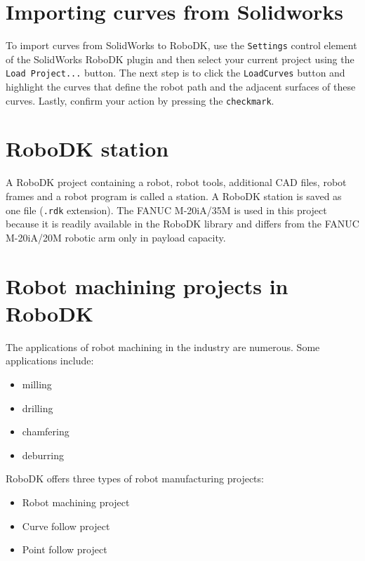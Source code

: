 \section{Importing curves from Solidworks}

To import curves from SolidWorks to RoboDK, use the \texttt{Settings} control element of the SolidWorks RoboDK plugin and then select your current project using the \texttt{Load Project...} button. The next step is to click the \texttt{LoadCurves} button and highlight the curves that define the robot path and the adjacent surfaces of these curves. Lastly, confirm your action by pressing the \texttt{checkmark}.

\section{RoboDK station}

A RoboDK project containing a robot, robot tools, additional CAD files, robot frames and a robot program is called a station. A RoboDK station is saved as one file (\texttt{.rdk} extension).  The FANUC M-20iA/35M is used in this project because it is readily available in the RoboDK library and differs from the FANUC M-20iA/20M robotic arm only in payload capacity.

\section{Robot machining projects in RoboDK}

The applications of robot machining in the industry are numerous. Some applications include:

\begin{itemize}

    \item milling
    \item drilling
    \item chamfering
    \item deburring

\end{itemize}

RoboDK offers three types of robot manufacturing projects:

\begin{itemize}

    \item Robot machining project
    \item Curve follow project 
    \item Point follow project 

\end{itemize}

